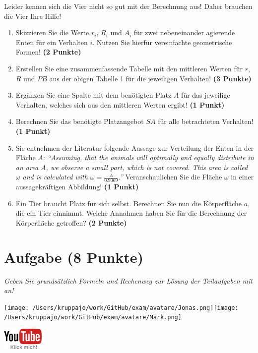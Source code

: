 \documentclass[a4paper, 9pt]{scrartcl}\usepackage[]{graphicx}\usepackage[]{xcolor}
\begin{document}
Leider kennen sich die Vier nicht so gut mit der Berechnung aus! Daher brauchen die Vier Ihre Hilfe!

\begin{enumerate}
\item Skizzieren Sie die Werte $r_i$, $R_i$ und $A_i$ für zwei nebeneinander agierende Enten für ein Verhalten $i$. Nutzen Sie hierfür vereinfachte geometrische Formen! \textbf{(2 Punkte)}
\item Erstellen Sie eine zusammenfassende Tabelle mit den mittleren Werten für $r$, $R$ und $PB$ aus der obigen Tabelle 1 für die jeweiligen Verhalten! \textbf{(3 Punkte)}
\item Ergänzen Sie eine Spalte mit dem benötigten Platz $A$ für das jeweilige Verhalten, welches sich aus den mittleren Werten ergibt! \textbf{(1 Punkt)}
\item Berechnen Sie das benötigte Platzangebot $SA$ für alle betrachteten Verhalten! \textbf{(1 Punkt)}
\item Sie entnehmen der Literatur folgende Aussage zur Verteilung der Enten in der Fläche $A$: \textit{"`Assuming, that the animals will optimally and equally distribute in an area $A$, we observe a
    small part, which is not covered. This area is called $\omega$ and is calculated with $\omega = \tfrac{A}{0.9069}$."'} Veranschaulichen Sie die Fläche $\omega$ in einer aussagekräftigen Abbildung!  \textbf{(1 Punkt)}
\item Ein Tier braucht Platz für sich selbst. Berechnen Sie nun die Körperfläche $a$, die ein Tier einnimmt. Welche Annahmen haben Sie für die Berechnung der Körperfläche getroffen? \textbf{(2 Punkte)}
\end{enumerate}



 
\clearpage

\section{Aufgabe \hfill (8 Punkte)}

\textit{Geben Sie grundsätzlich Formeln und Rechenweg zur Lösung der Teilaufgaben mit an!} \\[1Ex]
 

 
\begin{minipage}[t]{0.5\textwidth}
\texttt{[image: /Users/kruppajo/work/GitHub/exam/avatare/Jonas.png]}\hspace{-4mm}\texttt{[image: /Users/kruppajo/work/GitHub/exam/avatare/Mark.png]}
\end{minipage}
\begin{minipage}[t]{0.5\textwidth}
\hfill
\href{https://youtu.be/1B53cVFIU7Q}{\includegraphics[width = 2cm]{img/youtube}}
\end{minipage}
\end{document}
